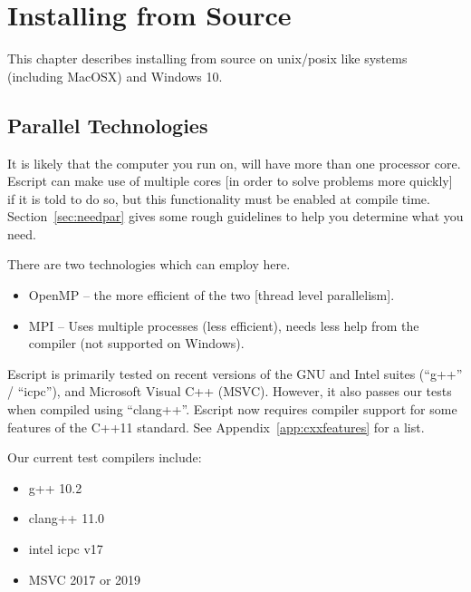 %
%
%


\chapter{Installing from Source}\label{chap:source}

This chapter describes installing \escript from source on unix/posix like
systems (including MacOSX) and Windows 10.

\section{Parallel Technologies}\label{sec:par}
It is likely that the computer you run \escript on, will have more than one processor core.
Escript can make use of multiple cores [in order to solve problems more quickly] if it is told to do so,
but this functionality must be enabled at compile time.
Section~\ref{sec:needpar} gives some rough guidelines to help you determine what you need.

There are two technologies which \escript can employ here.
\begin{itemize}
 \item OpenMP -- the more efficient of the two [thread level parallelism].
 \item MPI -- Uses multiple processes (less efficient), needs less help from
   the compiler (not supported on Windows).
\end{itemize}

Escript is primarily tested on recent versions of the GNU and Intel suites
(``g++'' / ``icpc''), and Microsoft Visual C++ (MSVC).  However, it also passes
our tests when compiled using ``clang++''.  Escript now requires compiler
support for some features of the C++11 standard.  See
Appendix~\ref{app:cxxfeatures} for a list.


Our current test compilers include:
\begin{itemize}
 \item g++ 10.2
 \item clang++ 11.0
 \item intel icpc v17
 \item MSVC 2017 or 2019
\end{itemize}


